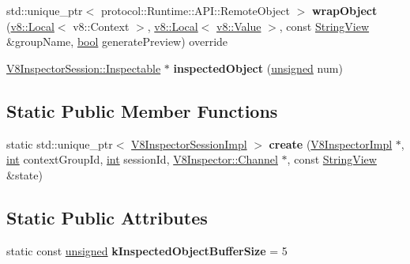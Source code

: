 \begin{DoxyCompactItemize}
std\+::unique\+\_\+ptr$<$ protocol\+::\+Runtime\+::\+A\+P\+I\+::\+Remote\+Object $>$ {\bfseries wrap\+Object} (\mbox{\hyperlink{classv8_1_1Local}{v8\+::\+Local}}$<$ v8\+::\+Context $>$, \mbox{\hyperlink{classv8_1_1Local}{v8\+::\+Local}}$<$ \mbox{\hyperlink{classv8_1_1Value}{v8\+::\+Value}} $>$, const \mbox{\hyperlink{classv8__inspector_1_1StringView}{String\+View}} \&group\+Name, \mbox{\hyperlink{classbool}{bool}} generate\+Preview) override
\item 
\mbox{\label{classv8__inspector_1_1V8InspectorSessionImpl_a381b4fee29510793fcd2c0902c4d289a}} 
\mbox{\hyperlink{classv8__inspector_1_1V8InspectorSession_1_1Inspectable}{V8\+Inspector\+Session\+::\+Inspectable}} $\ast$ {\bfseries inspected\+Object} (\mbox{\hyperlink{classunsigned}{unsigned}} num)
\end{DoxyCompactItemize}
\subsection*{Static Public Member Functions}
\begin{DoxyCompactItemize}
\item 
\mbox{\label{classv8__inspector_1_1V8InspectorSessionImpl_a6bd2f795fb514baaa38c9aa04882ef06}} 
static std\+::unique\+\_\+ptr$<$ \mbox{\hyperlink{classv8__inspector_1_1V8InspectorSessionImpl}{V8\+Inspector\+Session\+Impl}} $>$ {\bfseries create} (\mbox{\hyperlink{classv8__inspector_1_1V8InspectorImpl}{V8\+Inspector\+Impl}} $\ast$, \mbox{\hyperlink{classint}{int}} context\+Group\+Id, \mbox{\hyperlink{classint}{int}} session\+Id, \mbox{\hyperlink{classv8__inspector_1_1V8Inspector_1_1Channel}{V8\+Inspector\+::\+Channel}} $\ast$, const \mbox{\hyperlink{classv8__inspector_1_1StringView}{String\+View}} \&state)
\end{DoxyCompactItemize}
\subsection*{Static Public Attributes}
\begin{DoxyCompactItemize}
\item 
\mbox{\label{classv8__inspector_1_1V8InspectorSessionImpl_abc82104cb2728e474f6a55b3c0c2bc82}} 
static const \mbox{\hyperlink{classunsigned}{unsigned}} {\bfseries k\+Inspected\+Object\+Buffer\+Size} = 5
\end{DoxyCompactItemize}


